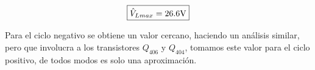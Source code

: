 \begin{equation} \label{eq:3}
\boxed{\hat{V}_{L{max}} = 26.6 \si[per-mode=symbol]{\volt}}
\end{equation}

Para el ciclo negativo se obtiene un valor cercano, haciendo un análisis similar, pero que involucra a los transistores $Q_{406}$ y $Q_{404}$, tomamos este valor para el ciclo positivo, de todos modos es solo una aproximación. 



\vfill

\clearpage
